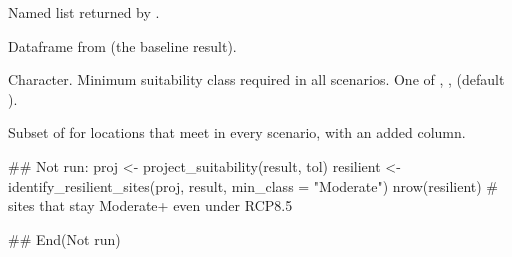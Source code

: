 \documentclass[a4paper]{book}
\begin{document}
%
\begin{Arguments}
\begin{ldescription}
\item[\code{projections}] Named list returned by .

\item[\code{baseline}] Dataframe from  (the baseline result).

\item[\code{min\_class}] Character. Minimum suitability class required in all
scenarios. One of , ,  (default ).
\end{ldescription}
\end{Arguments}
%
\begin{Value}
Subset of  for locations that meet  in every
scenario, with an added  column.
\end{Value}
%
\begin{Examples}
\begin{ExampleCode}
## Not run: 
proj      <- project_suitability(result, tol)
resilient <- identify_resilient_sites(proj, result, min_class = "Moderate")
nrow(resilient)  # sites that stay Moderate+ even under RCP8.5

## End(Not run)
\end{ExampleCode}
\end{Examples}
%
\end{document}
